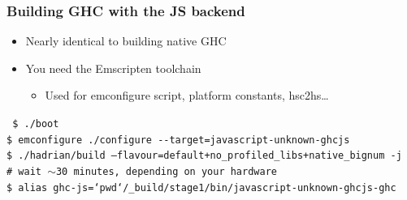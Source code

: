 \documentclass{beamer}
\begin{document}
\begin{frame}[fragile]
\frametitle{Building GHC with the JS backend}
\begin{itemize}
\item Nearly identical to building native GHC
\item You need the Emscripten toolchain
\begin{itemize}
\item Used for emconfigure script, platform constants, hsc2hs…
\end{itemize}
\end{itemize}

\vspace{1cm}

\texttt
{\scriptsize
\$ ./boot \\
\$ \alert{emconfigure} ./configure -{}-target=\alert{javascript-unknown-ghcjs} \\
\$ ./hadrian/build --flavour=default+no\_profiled\_libs+\alert{native\_bignum} -j \\
\vspace{0.5cm}
\# wait $\sim$30 minutes, depending on your hardware \\
\vspace{0.5cm}
\$ alias ghc-js=`pwd`/\_build/stage1/bin/javascript-unknown-ghcjs-ghc\\
}
\end{frame}
\end{document}

